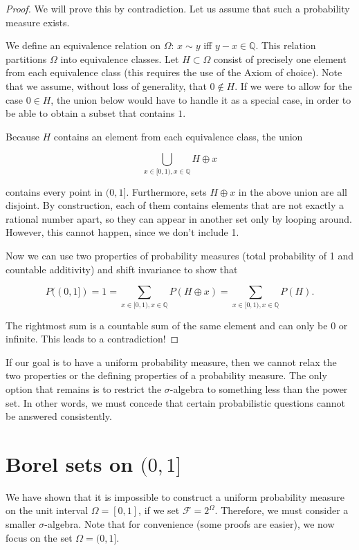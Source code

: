 \documentclass{book}
\theoremstyle{plain}%
\theoremstyle{definition}
\begin{document}
\begin{proof}
We will prove this by contradiction. Let us assume that such a probability measure exists.

We define an equivalence relation on $\Omega$: $x \sim y$ iff $y - x \in \mathbb{Q}$. This relation partitions $\Omega$ into equivalence classes. Let $H \subset \Omega$ consist of precisely one element from each equivalence class (this requires the use of the Axiom of choice). Note that we assume, without loss of generality, that $0 \notin H$. If we were to allow for the case $0 \in H$, the union below would have to handle it as a special case, in order to be able to obtain a subset that contains $1$.

Because $H$ contains an element from each equivalence class, the union

$$\displaystyle \bigcup_{x \in [0, 1), x \in \mathbb{Q}} H \oplus x$$

contains every point in $(0,1]$. Furthermore, sets $H \oplus x$ in the above union are all disjoint. By construction, each of them contains elements that are not exactly a rational number apart, so they can appear in another set only by looping around. However, this cannot happen, since we don't include 1.

Now we can use two properties of probability measures (total probability of 1 and countable additivity) and shift invariance to show that

$$P((0,1]) = 1 = \displaystyle \sum_{x \in [0, 1), x \in \mathbb{Q}} P(H \oplus x) = \displaystyle \sum_{x \in [0, 1), x \in \mathbb{Q}} P(H).$$

The rightmost sum is a countable sum of the same element and can only be 0 or infinite. This leads to a contradiction!
\end{proof}

If our goal is to have a uniform probability measure, then we cannot relax the two properties or the defining properties of a probability measure. The only option that remains is to restrict the $\sigma$-algebra to something less than the power set. In other words, we must concede that certain probabilistic questions cannot be answered consistently.

\section{Borel sets on $(0,1]$}

We have shown that it is impossible to construct a uniform probability measure on the unit interval $\Omega = [0, 1]$, if we set $\mathcal{F} = 2^\Omega$. Therefore, we must consider a smaller $\sigma$-algebra. Note that for convenience (some proofs are easier), we now focus on the set $\Omega = (0, 1]$.
\end{document}
